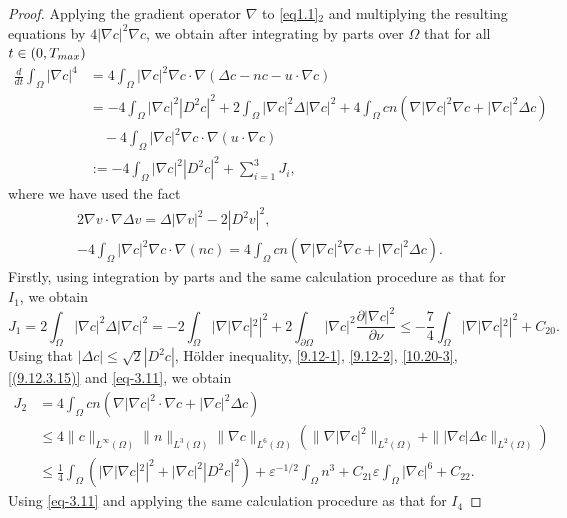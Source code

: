 \documentclass[10pt,a4paper]{amsart}
\numberwithin{equation}{section}
\begin{document}
\begin{proof}
Applying the gradient operator $\nabla$ to \eqref{eq1.1}$_2$ and multiplying the 
resulting equations by $4|\nabla c|^2 \nabla c$, we obtain after integrating by parts 
over $\Omega$ that for all $t \in (0, T_{\rm max})$
\begin{equation}\label{eq3.38}
\begin{aligned}
\frac{d}{dt} \int_{\Omega} |\nabla c|^4
&= 4 \int_{\Omega} |\nabla c|^2 \nabla c \cdot \nabla ( \Delta c - n c - u \cdot \nabla c ) \\
&=- 4 \int_{\Omega} |\nabla c|^2 |D^2 c|^2
+ 2 \int_{\Omega} |\nabla c|^2 \Delta |\nabla c|^2 + 4 \int_{\Omega} c n( \nabla |\nabla c|^2 \nabla c + |\nabla c|^2 \Delta c ) \\
& \quad - 4 \int_{\Omega} |\nabla c|^2 \nabla c \cdot \nabla (u \cdot \nabla c) \\
&:= - 4 \int_{\Omega} |\nabla c|^2 |D^2 c|^2 +\sum_{i=1}^{3}J_i,
\end{aligned}
\end{equation}
where we have used the fact 
\begin{gather*}
2\nabla v \cdot \nabla \Delta v = \Delta | \nabla v |^2 - 2 | D^2 v |^2 , \\
-4 \int_{\Omega}
|\nabla c|^2 \nabla c \cdot \nabla(n c) = 4 \int_{\Omega} c n( \nabla |\nabla c|^2 
\nabla c + |\nabla c|^2 \Delta c ).
\end{gather*}
Firstly, using integration by parts and the same calculation procedure as that for $I_1$, 
we obtain
\[
J_1 = 2 \int_{\Omega} |\nabla c|^2 \Delta |\nabla c|^2 
= -2 \int_{\Omega} |\nabla |\nabla c|^2|^2 + 2 \int_{\partial \Omega} |\nabla c|^2
\frac{\partial |\nabla c|^2}{\partial \nu}
 \leq -\frac{7}{4} \int_{\Omega} |\nabla |\nabla c|^2|^2 + C_{20}.
\]
Using that $ |\Delta c| \leq \sqrt{2} |D^2 c|$, H\"{o}lder inequality, 
\eqref{9.12-1}, \eqref{9.12-2}, \eqref{10.20-3}, \eqref{(9.12.3.15)} and 
\eqref{eq-3.11}, we obtain
\begin{align*}
J_2 
&= 4 \int_{\Omega} c n ( \nabla |\nabla c|^2 \cdot \nabla c + |\nabla c|^2 \Delta c )
\\
&\leq 4\|c\|_{L^\infty(\Omega)}\|n\|_{L^3(\Omega)} \|\nabla c\|_{L^6(\Omega)}
( \|\nabla |\nabla c|^2\|_{L^2(\Omega)} + \||\nabla c| \Delta c\|_{L^2(\Omega)} ) \\
&\leq \frac{1}{4} \int_{\Omega} \left(| \nabla |\nabla c|^2|^2
+ |\nabla c|^2 |D^2 c|^2\right) +\varepsilon^{-1/2}\int_{\Omega} n^3
 + C_{21}\varepsilon\int_{\Omega} |\nabla c|^6 + C_{22}.
\end{align*}
Using \eqref{eq-3.11} and applying the same calculation procedure as that for $I_4$ 

\end{proof}
\end{document}

